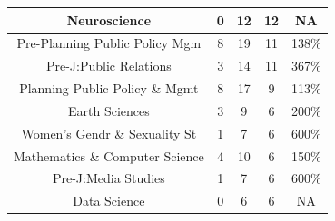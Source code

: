 \documentclass[10]{article}
\begin{document}
\begin{longtable}[c]{|ccccc|}
	\multicolumn{1}{|c|}{Neuroscience}                               & \multicolumn{1}{c|}{0}                               & \multicolumn{1}{c|}{12}                                  & \multicolumn{1}{c|}{12}                 & NA                    \\ \hline
	\multicolumn{1}{|c|}{Pre-Planning Public Policy Mgm}             & \multicolumn{1}{c|}{8}                               & \multicolumn{1}{c|}{19}                                  & \multicolumn{1}{c|}{11}                 & 138\%                 \\ \hline
	\multicolumn{1}{|c|}{Pre-J:Public Relations}                     & \multicolumn{1}{c|}{3}                               & \multicolumn{1}{c|}{14}                                  & \multicolumn{1}{c|}{11}                 & 367\%                 \\ \hline
	\multicolumn{1}{|c|}{Planning Public Policy \& Mgmt}             & \multicolumn{1}{c|}{8}                               & \multicolumn{1}{c|}{17}                                  & \multicolumn{1}{c|}{9}                  & 113\%                 \\ \hline
	\multicolumn{1}{|c|}{Earth Sciences}                             & \multicolumn{1}{c|}{3}                               & \multicolumn{1}{c|}{9}                                   & \multicolumn{1}{c|}{6}                  & 200\%                 \\ \hline
	\multicolumn{1}{|c|}{Women's Gendr \& Sexuality St}              & \multicolumn{1}{c|}{1}                               & \multicolumn{1}{c|}{7}                                   & \multicolumn{1}{c|}{6}                  & 600\%                 \\ \hline
	\multicolumn{1}{|c|}{Mathematics \& Computer Science}            & \multicolumn{1}{c|}{4}                               & \multicolumn{1}{c|}{10}                                  & \multicolumn{1}{c|}{6}                  & 150\%                 \\ \hline
	\multicolumn{1}{|c|}{Pre-J:Media Studies}                        & \multicolumn{1}{c|}{1}                               & \multicolumn{1}{c|}{7}                                   & \multicolumn{1}{c|}{6}                  & 600\%                 \\ \hline
	\multicolumn{1}{|c|}{Data Science}                               & \multicolumn{1}{c|}{0}                               & \multicolumn{1}{c|}{6}                                   & \multicolumn{1}{c|}{6}                  & NA                    \\ \hline

\end{longtable}
\end{document}
